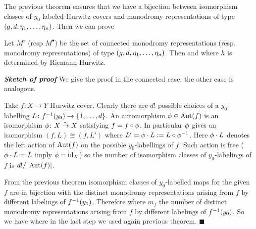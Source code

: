 \documentclass[10pt,handout]{beamer} %
\begin{document}
\begin{frame}

The previous theorem ensures that we have a bijection between isomorphism classes of $y_0$-labeled Hurwitz covers and monodromy representations of type $(g,d,\eta_1,\ldots,\eta_n)$. \pause Then we can prove

\begin{theorem}
	Let $M^\circ$ (resp $M^\bullet$) be the set of connected monodromy representations (resp. monodromy representations) of type $(g,d,\eta_1,\ldots,\eta_n)$. Then
	and
	where $h$ is determined by Riemann-Hurwitz. 
\end{theorem}

\emph{\bf Sketch of proof}
	We give the proof in the connected case, the other case is analogous. 

\end{frame}

\begin{frame}


	
	Take $f\colon X\to Y$ Hurwitz cover. Clearly there are $d!$ possible choices of a $y_0$-labelling $L\colon f^{-1}(y_0)\to \{1,\ldots,d\}$. An automorphism $\phi\in\operatorname{Aut}(f)$ is an isomorphism $\phi\colon X\overset\sim\to X$ satisfying $f=f\circ\phi$. In particular $\phi$ gives an isomorphism $(f,L)\cong(f,L')$ where $L'=\phi\cdot L:=L\circ\phi^{-1}$. Here $\phi\cdot L$ denotes the left action of $\operatorname{Aut}(f)$ on the possible $y_0$-labellings of $f$. Such action is free (\ie $\phi\cdot L=L$ imply $\phi=\textrm{id}_X$) so the number of isomorphism classes of $y_0$-labelings of $f$ is $d!/|\operatorname{Aut}(f)|$. 
	
	From the previous theorem isomorphism classes of $y_0$-labelled maps for the given $f$ are in bijection with the distinct monodromy representations arising from $f$ by different labelings of $f^{-1}(y_0)$. Therefore 
	where $m_f$ the number of distinct monodromy representations arising from $f$ by different labelings of $f^{-1}(y_0)$. So we have
	where in the last step we used again previous theorem.
	\hfill$\blacksquare$
\end{frame}
\end{document}
